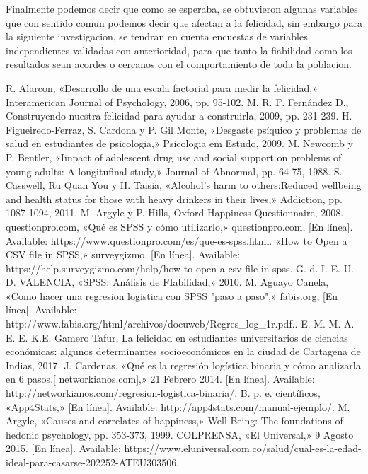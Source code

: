 \documentclass[conference]{IEEEtran}
\begin{document}
Finalmente podemos decir que como se esperaba, se obtuvieron algunas variables que con sentido comun podemos decir que afectan a la felicidad, sin embargo para la siguiente investigacion, se tendran en cuenta encuestas de variables independientes validadas con anterioridad, para que tanto la fiabilidad como los resultados sean acordes o cercanos con el comportamiento de toda la poblacion.

\begin{thebibliography}{99}
R. Alarcon, «Desarrollo de una escala factorial para medir la felicidad,» Interamerican Journal of Psychology, 2006, pp. 95-102.
M. R. F. Fernández D., Construyendo nuestra felicidad para ayudar a construirla, 2009, pp. 231-239.
H. Figueiredo-Ferraz, S. Cardona y P. Gil Monte, «Desgaste psíquico y problemas de salud en estudiantes de psicologia,» Psicologia em Estudo, 2009. 
M. Newcomb y P. Bentler, «Impact of adolescent drug use and social support on problems of young adults: A longitufinal study,» Journal of Abnormal, pp. 64-75, 1988. 
S. Casswell, Ru Quan You y H. Taisia, «Alcohol's harm to others:Reduced wellbeing and health status for those with heavy drinkers in their lives,» Addiction, pp. 1087-1094, 2011. 
M. Argyle y P. Hills, Oxford Happiness Questionnaire, 2008. 
questionpro.com, «Qué es SPSS y cómo utilizarlo,» questionpro.com, [En línea]. Available: https://www.questionpro.com/es/que-es-spss.html.
«How to Open a CSV file in SPSS,» surveygizmo, [En línea]. Available: https://help.surveygizmo.com/help/how-to-open-a-csv-file-in-spss.
G. d. I. E. U. D. VALENCIA, «SPSS: Análisis de FIabilidad,» 2010.
M. Aguayo Canela, «Como hacer una regresion logistica con SPSS "paso a paso",» fabis.org, [En línea]. Available: http://www.fabis.org/html/archivos/docuweb/Regres\_log\_1r.pdf..
E. M. M. A. E. E. K.E. Gamero Tafur, La felicidad en estudiantes universitarios de ciencias económicas: algunos determinantes socioeconómicos en la ciudad de Cartagena de Indias, 2017. 
J. Cardenas, «Qué es la regresión logística binaria y cómo analizarla en 6 pasos.[ networkianos.com],» 21 Febrero 2014. [En línea]. Available: http://networkianos.com/regresion-logistica-binaria/.
B. p. e. científicos, «App4Stats,» [En línea]. Available: http://app4stats.com/manual-ejemplo/.
M. Argyle, «Causes and correlates of happiness,» Well-Being: The foundations of hedonic psychology, pp. 353-373, 1999. 
COLPRENSA, «El Universal,» 9 Agosto 2015. [En línea]. Available: https://www.eluniversal.com.co/salud/cual-es-la-edad-ideal-para-casarse-202252-ATEU303506.




\end{thebibliography}
\end{document}
